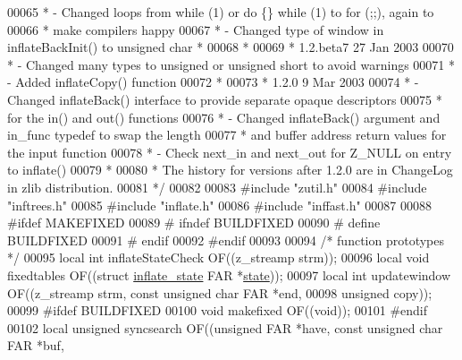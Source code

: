 \begin{DoxyCode}
00065 \textcolor{comment}{ * - Changed loops from while (1) or do \{\} while (1) to for (;;), again to}
00066 \textcolor{comment}{ *   make compilers happy}
00067 \textcolor{comment}{ * - Changed type of window in inflateBackInit() to unsigned char *}
00068 \textcolor{comment}{ *}
00069 \textcolor{comment}{ * 1.2.beta7    27 Jan 2003}
00070 \textcolor{comment}{ * - Changed many types to unsigned or unsigned short to avoid warnings}
00071 \textcolor{comment}{ * - Added inflateCopy() function}
00072 \textcolor{comment}{ *}
00073 \textcolor{comment}{ * 1.2.0        9 Mar 2003}
00074 \textcolor{comment}{ * - Changed inflateBack() interface to provide separate opaque descriptors}
00075 \textcolor{comment}{ *   for the in() and out() functions}
00076 \textcolor{comment}{ * - Changed inflateBack() argument and in\_func typedef to swap the length}
00077 \textcolor{comment}{ *   and buffer address return values for the input function}
00078 \textcolor{comment}{ * - Check next\_in and next\_out for Z\_NULL on entry to inflate()}
00079 \textcolor{comment}{ *}
00080 \textcolor{comment}{ * The history for versions after 1.2.0 are in ChangeLog in zlib distribution.}
00081 \textcolor{comment}{ */}
00082 
00083 \textcolor{preprocessor}{#include "zutil.h"}
00084 \textcolor{preprocessor}{#include "inftrees.h"}
00085 \textcolor{preprocessor}{#include "inflate.h"}
00086 \textcolor{preprocessor}{#include "inffast.h"}
00087 
00088 \textcolor{preprocessor}{#ifdef MAKEFIXED}
00089 \textcolor{preprocessor}{#  ifndef BUILDFIXED}
00090 \textcolor{preprocessor}{#    define BUILDFIXED}
00091 \textcolor{preprocessor}{#  endif}
00092 \textcolor{preprocessor}{#endif}
00093 
00094 \textcolor{comment}{/* function prototypes */}
00095 local \textcolor{keywordtype}{int} inflateStateCheck OF((z\_streamp strm));
00096 local \textcolor{keywordtype}{void} fixedtables OF((\textcolor{keyword}{struct} \hyperlink{structinflate__state}{inflate\_state} FAR *\hyperlink{structstate}{state}));
00097 local \textcolor{keywordtype}{int} updatewindow OF((z\_streamp strm, \textcolor{keyword}{const} \textcolor{keywordtype}{unsigned} \textcolor{keywordtype}{char} FAR *end,
00098                            \textcolor{keywordtype}{unsigned} copy));
00099 \textcolor{preprocessor}{#ifdef BUILDFIXED}
00100    \textcolor{keywordtype}{void} makefixed OF((\textcolor{keywordtype}{void}));
00101 \textcolor{preprocessor}{#endif}
00102 local \textcolor{keywordtype}{unsigned} syncsearch OF((\textcolor{keywordtype}{unsigned} FAR *have, \textcolor{keyword}{const} \textcolor{keywordtype}{unsigned} \textcolor{keywordtype}{char} FAR *buf,

\end{DoxyCode}
